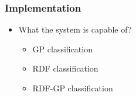 \documentclass[mathserif]{beamer}
\begin{document}
\begin{frame}
\frametitle{Implementation}

\begin{itemize}
\item What the system is capable of?
\begin{itemize}
\item GP classification
\item RDF classification
\item RDF-GP classification
\end{itemize}
\end{itemize}

\end{frame}
\end{document}

